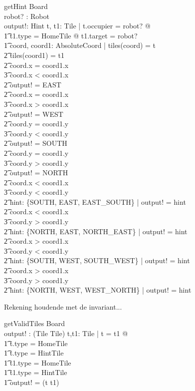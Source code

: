\documentclass[a4paper,11pt]{article}
\begin{document}
\begin{schema}{getHint}
\Xi Board \\
robot? : Robot \\
output!: Hint
\where
\exists t, t1: Tile | t.occupier = robot? @\\ \t1
t1.type = HomeTile @ t1.target = robot? \\ \t1
\exists coord, coord1: AbsoluteCoord | tiles(coord) = t \\ \t2
tiles(coord1) = t1 \\ \t2
\IF coord.x = coord1.x \\ \t3
coord.x < coord1.x \\ \t2
\THEN output! = EAST \\ \t2
\IF coord.x = coord1.x \\ \t3
coord.x > coord1.x \\ \t2
\THEN output! = WEST \\ \t2
\IF coord.y = coord1.y \\ \t3
coord.y < coord1.y \\ \t2
\THEN output! = SOUTH \\ \t2
\IF coord.y = coord1.y \\ \t3
coord.y > coord1.y \\ \t2
\THEN output! = NORTH \\ \t2
\IF coord.x < coord1.x \\ \t3
coord.y < coord1.y \\ \t2
\THEN \exists hint: \{SOUTH, EAST, EAST\_SOUTH\} | output! = hint \\ \t2
\IF coord.x < coord1.x \\ \t3
coord.y > coord1.y \\ \t2
\THEN \exists hint: \{NORTH, EAST, NORTH\_EAST\} | output! = hint \\ \t2
\IF coord.x > coord1.x \\ \t3
coord.y < coord1.y \\ \t2
\THEN \exists hint: \{SOUTH, WEST, SOUTH\_WEST\} | output! = hint \\ \t2
\IF coord.x > coord1.x \\ \t3
coord.y > coord1.y \\ \t2
\THEN \exists hint: \{NORTH, WEST, WEST\_NORTH\} | output! = hint
\end{schema}

Rekening houdende met de invariant...
\begin{schema}{getValidTiles}
\Xi Board \\
output! : (Tile \cross Tile)
\where
\exists t,t1: Tile | t \not = t1  @ \\ \t1
t.type \not = HomeTile \\ \t1
t.type \not = HintTile \\ \t1
t1.type \not = HomeTile \\ \t1
t1.type \not = HintTile \implies \\ \t1
output! = (t \cross t1)
\end{schema}
\end{document}
